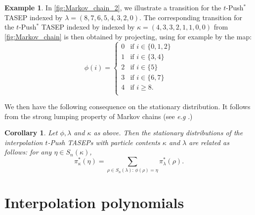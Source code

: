 \documentclass[12pt]{amsart}
\newtheorem{cor}[thm]{Corollary}
\theoremstyle{definition}
\newtheorem{example}[thm]{Example}
\begin{document}
\begin{example}
    In \cref{fig:Markov_chain_2}, we illustrate a transition for the $t$-Push$^*$ TASEP indexed by $\lambda=(8,7,6,5,4,3,2,0)$.  The corresponding transition for the $t$-Push$^*$ TASEP indexed by indexed by $\kappa=(4,3,3,2,1,1,0,0)$ from \cref{fig:Markov_chain} is then obtained by projecting, using for example by the map:
    $$\phi(i)=\begin{cases}
        0 & \text{if $i\in \{0,1,2\}$}\\
        1 & \text{if $i\in \{3,4\}$}\\
        2 & \text{if $i\in \{5\}$}\\
        3 & \text{if $i\in \{6,7\}$}\\
        4 & \text{if $i\geq 8$.}\\
    \end{cases}$$
\end{example}

We then have the following consequence on the stationary distribution. It follows from the strong lumping property of Markov chains (see \textit{e.g} \cite{KemenySnell1976,Pang2019,Williams2022}.)

\begin{cor}\label{cor:lumping}
Let $\phi,\lambda$ and $\kappa$ as above. Then  the stationary distributions of the 
interpolation $t$-Push TASEPs with particle contents $\kappa$ and $\lambda$ are related as follows:
for any $\eta\in S_n(\kappa)$, 
$$\pi^*_\kappa(\eta)=\sum_{\rho\in S_n(\lambda):\, \phi(\rho)=\eta}\pi^*_\lambda(\rho).$$
\end{cor}
\fi

\iffalse 

\section{Interpolation polynomials}\label{sec:interpolation_polynomials}
\end{document}
